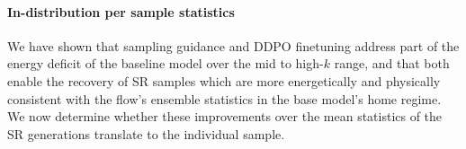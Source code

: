 
\paragraph{In-distribution per sample statistics} We have shown that sampling guidance
and DDPO finetuning address part of the energy deficit of the baseline model over the
mid to high-$k$ range, and that both enable the recovery of SR samples which are more
energetically and physically consistent with the flow's ensemble statistics in the base
model's home regime. We now determine whether these improvements over the mean
statistics of the SR generations translate to the individual sample.\newline

